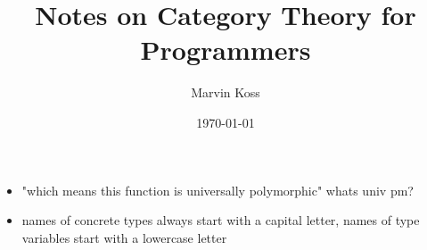 \documentclass{article}
\title{Notes on Category Theory for Programmers}
\author{Marvin Koss}
\date{\today}
\begin{document}
\maketitle

\tableofcontents

\section{} %

\begin{itemize}
	\item "which means this function is universally polymorphic" whats univ pm?
	\item names of concrete types always start with a capital letter, names
of type variables start with a lowercase letter
\end{itemize}
\end{document}
